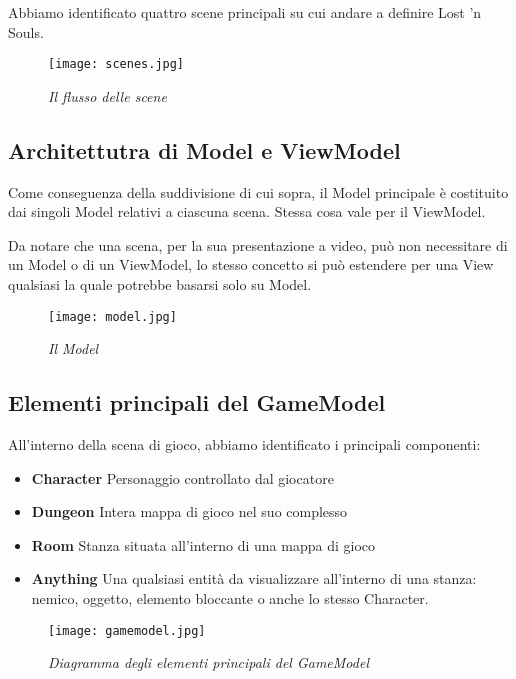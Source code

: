 Abbiamo identificato quattro scene principali su cui andare a definire Lost 'n Souls. 

\begin{figure}[!hbt]
    \centering
    \texttt{[image: scenes.jpg]}
    \caption{\textit{Il flusso delle scene}}
\end{figure}

\subsection{Architettutra di Model e ViewModel}

Come conseguenza della suddivisione di cui sopra, il Model principale è costituito dai singoli Model relativi a ciascuna scena. Stessa cosa vale per il ViewModel. 

Da notare che una scena, per la sua presentazione a video, può non necessitare di un Model o di un ViewModel, lo stesso concetto si può estendere per una View qualsiasi la quale potrebbe basarsi solo su Model.

\begin{figure}[!hbt]
    \centering
    \texttt{[image: model.jpg]}
    \caption{\textit{Il Model}} 
\end{figure}

\newpage 
\subsection{Elementi principali del GameModel}
All'interno della scena di gioco, abbiamo identificato i principali componenti:

\begin{itemize}
    \item \textbf{Character} Personaggio controllato dal giocatore
    \item \textbf{Dungeon} Intera mappa di gioco nel suo complesso
    \item \textbf{Room} Stanza situata all'interno di una mappa di gioco
    \item \textbf{Anything} Una qualsiasi entità da visualizzare all'interno di una stanza: nemico, oggetto, elemento bloccante o anche lo stesso Character. 
    
\end{itemize}


\begin{figure}[!hbt]
    \centering
    \texttt{[image: gamemodel.jpg]}
    \caption{\textit{Diagramma degli elementi principali del GameModel}} 
\end{figure}

